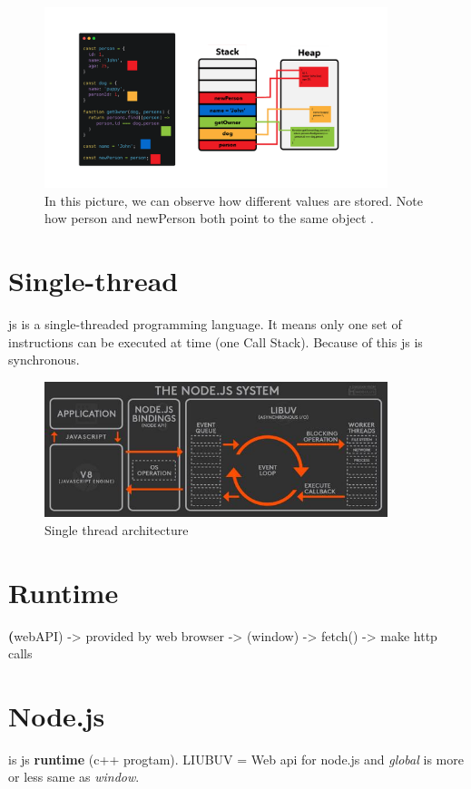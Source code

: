         \begin{figure}[h]
            \begin{center}
                \includegraphics[width=10cm]{01/images/02-stack-heap.png}
                \caption[Memory heap vs Call stack]{In this picture, we can observe how different values are stored. Note how person and newPerson both point to the same object \cite{JavaScriptMemoryManagment2020}.}
            \end{center}
        \end{figure}

    \section{Single-thread}
    \acrshort{js} is a single-threaded programming language. It means only one set of instructions can be executed at time (one Call Stack).
    Because of this \acrshort{js} is synchronous.

    \begin{figure}[h]
        \begin{center}
            \includegraphics[width=10cm]{01/images/04-single-thread.jpeg}
            \caption[Single thread]{Single thread architecture}
        \end{center}
    \end{figure}

    \section{Runtime}

    \textbf(webAPI) -> provided by web browser ->  (window) -> fetch() -> make http calls

    \section{Node.js}

    is \acrshort{js} \textbf{runtime} (c++ progtam). LIUBUV = Web api for node.js and \textit{global} is more or less same as \textit{window}.

    


    

   
